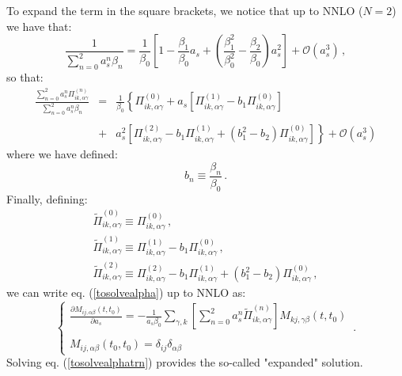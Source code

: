 \documentclass[10pt,a4paper]{article}
\begin{document}
To expand the term in the square brackets, we notice that up to NNLO ($N=2$)
we have that:
\begin{equation}
\frac{1}{\displaystyle \sum_{n=0}^{2} a_s^n \beta_n} =
\frac1{\beta_0}\left[ 1 - \frac{\beta_1}{\beta_0} a_s + \left(\frac{\beta_1^2}{\beta_0^2}- \frac{\beta_2}{\beta_0}\right)a_s^2\right] + \mathcal{O}(a_s^{3})\,,
\end{equation}
so that:
\begin{equation}
\begin{array}{rcl}
\displaystyle\frac{\displaystyle \sum_{n=0}^2 a_s^n
    \Pi_{ik,\alpha\gamma}^{(n)}}{ \displaystyle \sum_{n=0}^{2} a_s^n
    \beta_n} &=&\displaystyle \frac{1}{\beta_0}\left\{\Pi_{ik,\alpha\gamma}^{(0)} +
a_s\left[\Pi_{ik,\alpha\gamma}^{(1)} - b_1 \Pi_{ik,\alpha\gamma}^{(0)}\right]\right.\\
\\
&+& \displaystyle
\left. a_s^2\left[\Pi_{ik,\alpha\gamma}^{(2)} - b_1
\Pi_{ik,\alpha\gamma}^{(1)} +\left(b_1^2-b_2\right)
\Pi_{ik,\alpha\gamma}^{(0)} \right]\right\}  + \mathcal{O}(a_s^{3})
\end{array}
\end{equation}
where we have defined:
\begin{equation}
b_n \equiv \frac{\beta_n}{\beta_0}\,.
\end{equation}
Finally, defining:
\begin{equation}
\begin{array}{l}
\displaystyle\widetilde{\Pi}_{ik,\alpha\gamma}^{(0)} \equiv
\Pi_{ik,\alpha\gamma}^{(0)} \,,\\
\displaystyle\widetilde{\Pi}_{ik,\alpha\gamma}^{(1)} \equiv
\Pi_{ik,\alpha\gamma}^{(1)} - b_1 \Pi_{ik,\alpha\gamma}^{(0)} \,,\\
\displaystyle\widetilde{\Pi}_{ik,\alpha\gamma}^{(2)} \equiv \Pi_{ik,\alpha\gamma}^{(2)} - b_1
\Pi_{ik,\alpha\gamma}^{(1)} +\left(b_1^2-b_2\right)
\Pi_{ik,\alpha\gamma}^{(0)}\,,
\end{array}
\end{equation}
we can write eq. (\ref{tosolvealpha}) up to NNLO as:
\begin{equation}
\left\{\begin{array}{l}
\displaystyle \frac{\partial  M_{ij,\alpha\beta}(t,t_0)}{\partial
  a_s}= -\frac{1}{a_s\beta_0}\sum_{\gamma,k} \left[\displaystyle \sum_{n=0}^2 a_s^n
    \widetilde{\Pi}_{ik,\alpha\gamma}^{(n)}\right]M_{kj,\gamma\beta}(t,t_0)\\
\\
\displaystyle M_{ij,\alpha\beta}(t_0,t_0)=\delta_{ij}\delta_{\alpha\beta}
\end{array}\right.\,.
\label{tosolvealphatrn}
\end{equation}
Solving eq. (\ref{tosolvealphatrn}) provides the so-called "expanded" solution.
\end{document}
